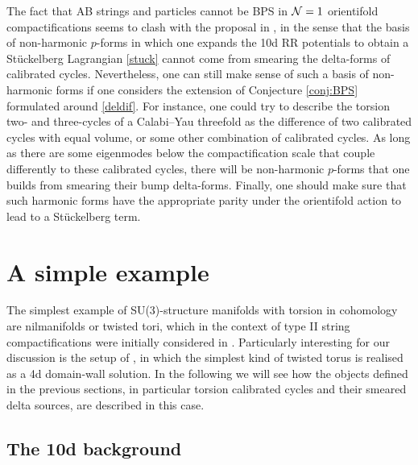 \documentclass[11pt]{article}
\def\CN {{\cal N}}
\begin{document}
The fact that AB strings and particles cannot be BPS in $\CN=1$ orientifold compactifications seems to clash with the proposal in \cite{Camara:2011jg}, in the sense that the basis of non-harmonic $p$-forms in which one expands the 10d RR potentials to obtain a St\"uckelberg Lagrangian \eqref{stuck} cannot come from smearing the delta-forms of calibrated cycles. Nevertheless, one can still make sense of such a basis of non-harmonic forms if one considers the extension of Conjecture \ref{conj:BPS} formulated around \eqref{deldif}. For instance, one could try to describe the torsion two- and three-cycles of a Calabi--Yau threefold as the difference of two calibrated cycles with equal volume, or some other combination of calibrated cycles. As long as there are some eigenmodes below the compactification scale that couple differently to these calibrated cycles, there will be non-harmonic $p$-forms that one builds from smearing their bump delta-forms. Finally, one should make sure that such harmonic forms have the appropriate parity under the orientifold action to lead to a St\"uckelberg term. 




\section{A simple example}
\label{s:simple}

The simplest example of SU(3)-structure manifolds with torsion in cohomology are nilmanifolds or twisted tori, which in the context of type II string compactifications were initially considered in \cite{Gurrieri:2002wz,LopesCardoso:2002vpf,Kachru:2002sk}. Particularly interesting for our discussion is the setup of \cite{Gurrieri:2002wz}, in which the simplest kind of twisted torus is realised as a 4d domain-wall solution. In the following we will see how the objects defined in the previous sections, in particular torsion calibrated cycles and their smeared delta sources, are described in this case. 

\subsection{The 10d background}
\end{document}
